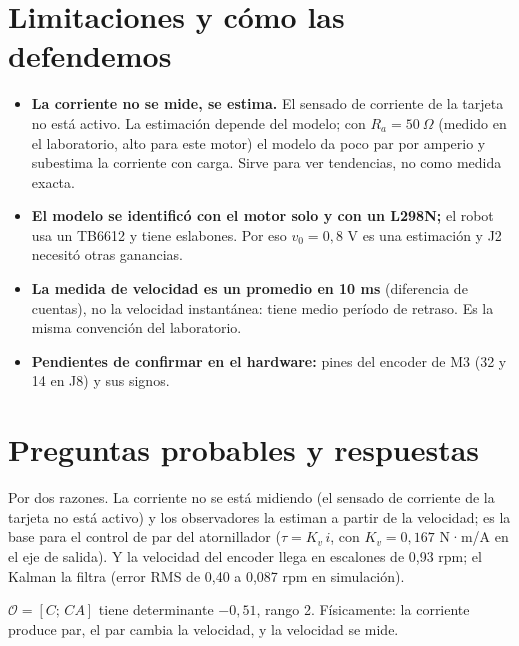 \documentclass[11pt]{article}
\begin{document}
\section{Limitaciones y cómo las defendemos}

\begin{alerta}
\begin{itemize}
  \item \textbf{La corriente no se mide, se estima.} El sensado de corriente de la tarjeta no está activo. La estimación depende del modelo; con $R_a=50~\Omega$ (medido en el laboratorio, alto para este motor) el modelo da poco par por amperio y subestima la corriente con carga. Sirve para ver tendencias, no como medida exacta.
  \item \textbf{El modelo se identificó con el motor solo y con un L298N;} el robot usa un TB6612 y tiene eslabones. Por eso $v_0=0{,}8$ V es una estimación y J2 necesitó otras ganancias.
  \item \textbf{La medida de velocidad es un promedio en 10 ms} (diferencia de cuentas), no la velocidad instantánea: tiene medio período de retraso. Es la misma convención del laboratorio.
  \item \textbf{Pendientes de confirmar en el hardware:} pines del encoder de M3 (32 y 14 en J8) y sus signos.
\end{itemize}
\end{alerta}

\section{Preguntas probables y respuestas}

\begin{preg}
Por dos razones. La corriente no se está midiendo (el sensado de corriente de la tarjeta no está activo) y los observadores la estiman a partir de la velocidad; es la base para el control de par del atornillador ($\tau=K_v\,i$, con $K_v=0{,}167$ N·m/A en el eje de salida). Y la velocidad del encoder llega en escalones de 0,93 rpm; el Kalman la filtra (error RMS de 0,40 a 0,087 rpm en simulación).
\end{preg}

\begin{preg}
$\mathcal O=[C;\,CA]$ tiene determinante $-0{,}51$, rango 2. Físicamente: la corriente produce par, el par cambia la velocidad, y la velocidad se mide.
\end{preg}
\end{document}
